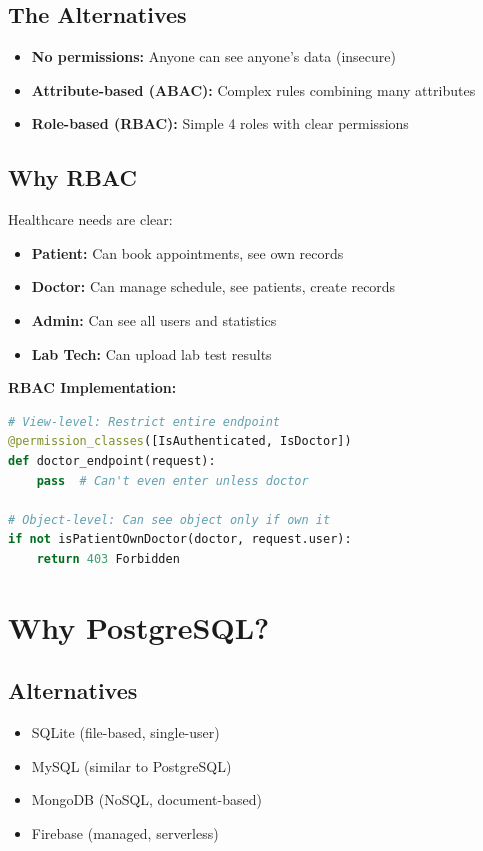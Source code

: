 \documentclass[11pt,a4paper,twoside]{report}
\begin{document}
\subsection{The Alternatives}
\begin{itemize}
    \item \textbf{No permissions:} Anyone can see anyone's data (insecure)
    \item \textbf{Attribute-based (ABAC):} Complex rules combining many attributes
    \item \textbf{Role-based (RBAC):} Simple 4 roles with clear permissions
\end{itemize}

\subsection{Why RBAC}

Healthcare needs are clear:
\begin{itemize}
    \item \textbf{Patient:} Can book appointments, see own records
    \item \textbf{Doctor:} Can manage schedule, see patients, create records
    \item \textbf{Admin:} Can see all users and statistics
    \item \textbf{Lab Tech:} Can upload lab test results
\end{itemize}

\textbf{RBAC Implementation:}

\begin{lstlisting}[language=Python]
# View-level: Restrict entire endpoint
@permission_classes([IsAuthenticated, IsDoctor])
def doctor_endpoint(request):
    pass  # Can't even enter unless doctor

# Object-level: Can see object only if own it
if not isPatientOwnDoctor(doctor, request.user):
    return 403 Forbidden
\end{lstlisting}

\section{Why PostgreSQL?}

\subsection{Alternatives}
\begin{itemize}
    \item SQLite (file-based, single-user)
    \item MySQL (similar to PostgreSQL)
    \item MongoDB (NoSQL, document-based)
    \item Firebase (managed, serverless)
\end{itemize}
\end{document}
